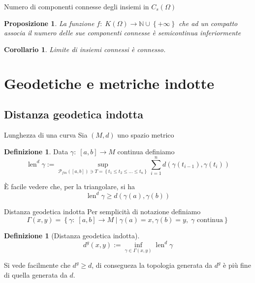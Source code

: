 \documentclass{beamer}
\newcounter{counter1}
\theoremstyle{plain}
\newtheorem{mypro}[counter1]{Proposizione}
\newtheorem{mycor}[counter1]{Corollario}
\theoremstyle{definition}
\newtheorem{mydef}[counter1]{Definizione}
\theoremstyle{remark}
\newcommand{\set}[1]{\left\{#1\right\}}
\newcommand{\pa}[1]{\left(#1\right)}
\newcommand{\bra}[1]{\left[#1\right]}
\DeclareMathOperator{\len}{len}
\begin{document}
\begin{frame}{Numero di componenti connesse degli insiemi in
    $C_s(\Omega)$}
  \begin{mypro}
    La funzione $f:\; K(\Omega) \rightarrow \mathbb{N} \cup \set{+\infty}$
    che ad un compatto associa il numero delle sue componenti connesse è
    semicontinua inferiormente
  \end{mypro}
  \begin{mycor}
    Limite di insiemi connessi è connesso.
  \end{mycor}
\end{frame}

\section{Geodetiche e metriche indotte}

\subsection{Distanza geodetica indotta}

\begin{frame}{Lunghezza di una curva}
  Sia $(M,d)$ uno spazio metrico
  \begin{mydef}
    Data $\gamma : \; \bra{a,b} \to M$ continua definiamo
    \[ \len^d \gamma := \sup _{\mathcal{P}_{fin}(\bra{a,b}) \ni T =
      \set{t_1 \le t_2 \le ... \le t_n}} \sum_{i=1}^n d\pa{
      \gamma\pa{t_{i-1}}, \gamma\pa{t_i}} \]
  \end{mydef}
  È facile vedere che, per la triangolare, si ha
  \[ \len^d \gamma \ge d\pa{\gamma\pa{a}, \gamma\pa{b}} \]

\end{frame}

\begin{frame}{Distanza geodetica indotta}
  Per semplicità di notazione definiamo
  \[ \Gamma (x,y) = \set{\gamma:\; \bra{a,b} \to M \mid
    \gamma(a) = x, \gamma(b) = y,\; \gamma \text{ continua}} \]
  
  \begin{mydef}[Distanza geodetica indotta]
    \[ d^g (x,y) := \inf _{\gamma \in \Gamma(x,y)} \len^d \gamma \]
  \end{mydef}

  Si vede facilmente che $d^g \ge d$, di consegueza la topologia
  generata da $d^g$ è più fine di quella generata da $d$.
\end{frame}
\end{document}
